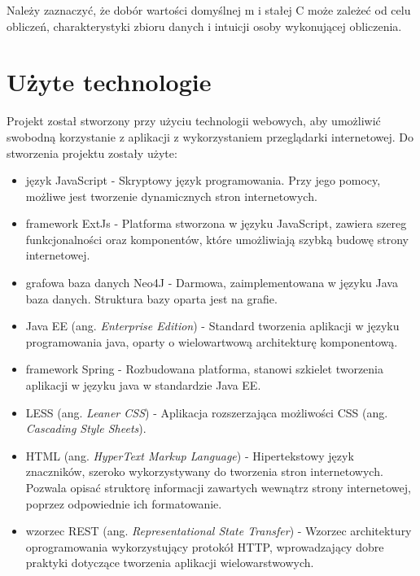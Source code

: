 Należy zaznaczyć, że dobór wartości domyślnej m i stałej C może zależeć od celu obliczeń, charakterystyki zbioru danych i intuicji osoby wykonującej obliczenia.

\section{Użyte technologie}
Projekt został stworzony przy użyciu technologii webowych, aby umożliwić swobodną korzystanie z aplikacji z wykorzystaniem przeglądarki internetowej. Do stworzenia projektu zostały użyte:
\begin{itemize}
\item język JavaScript - Skryptowy język programowania. Przy jego pomocy, możliwe jest tworzenie dynamicznych stron internetowych.\cite{js}
\item framework ExtJs - Platforma stworzona w języku JavaScript, zawiera szereg funkcjonalności oraz komponentów, które umożliwiają szybką budowę strony internetowej.\cite{extjs}
\item grafowa baza danych Neo4J - Darmowa, zaimplementowana w języku Java baza danych. Struktura bazy oparta jest na grafie.
\item Java EE (ang. \textit{Enterprise Edition}) - Standard tworzenia aplikacji w języku programowania java, oparty o wielowartwową architekturę komponentową.\cite{javaee}
\item framework Spring - Rozbudowana platforma, stanowi szkielet tworzenia aplikacji w języku java w standardzie Java EE.\cite{springAction}
\item LESS (ang. \textit{Leaner CSS}) - Aplikacja rozszerzająca możliwości CSS (ang. \textit{Cascading Style Sheets}).\cite{LESS}
\item HTML (ang. \textit{HyperText Markup Language}) - Hipertekstowy język znaczników, szeroko wykorzystywany do tworzenia stron internetowych. Pozwala opisać struktorę informacji zawartych wewnątrz strony internetowej, poprzez odpowiednie ich formatowanie.\cite{html}
\item wzorzec REST (ang. \textit{Representational State Transfer}) - Wzorzec architektury oprogramowania wykorzystujący protokół HTTP, wprowadzający dobre praktyki dotyczące tworzenia aplikacji wielowarstwowych.\cite{restWww}
\end{itemize}

